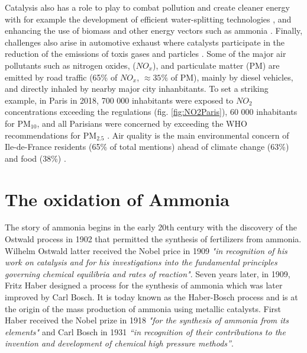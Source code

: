 Catalysis also has a role to play to combat pollution and create cleaner energy with for example the development of efficient water-splitting technologies \parencite{AHMAD2015599}, and enhancing the use of biomass and other energy vectors such as ammonia \parencite{Fang2022}.
Finally, challenges also arise in automotive exhaust where catalysts participate in the reduction of the emissions of toxis gases and particles \parencite{WHOAirPollution, GANDHI2003433}.
Some of the major air pollutants such as nitrogen oxides, ($NO_x$), and particulate matter (PM) are emitted by road traffic (65\% of $NO_x$, $\approx 35\%$ of PM), mainly by diesel vehicles, and directly inhaled by nearby major city inhanbitants.
To set a striking example, in Paris in 2018, 700 000 inhabitants were exposed to $NO_2$ concentrations exceeding the regulations (fig. \ref{fig:NO2Paris}), 60 000 inhabitants for PM$_{10}$, and all Parisians were concerned by exceeding the WHO recommendations for PM$_{2.5}$ \parencite{AirParis}.
Air quality is the main environmental concern of Ile-de-France residents (65\% of total mentions) ahead of climate change (63\%) and food (38\%) \parencite{AirParis}.

\section{The oxidation of Ammonia}

The story of ammonia begins in the early 20th century with the discovery of the Ostwald process in 1902 that permitted the synthesis of fertilizers from ammonia.
Wilhelm Ostwald latter received the Nobel price in 1909 \textit{"in recognition of his work on catalysis and for his investigations into the fundamental principles governing chemical equilibria and rates of reaction"}.
Seven years later, in 1909, Fritz Haber designed a process for the synthesis of ammonia which was later improved by Carl Bosch.
It is today known as the Haber-Bosch process and is at the origin of the mass production of ammonia using metallic catalysts.
First Haber received the Nobel prize in 1918 \textit{"for the synthesis of ammonia from its elements"} \parencite{Alexander1920} and Carl Bosch in 1931 \textit{“in recognition of their contributions to the invention and development of chemical high pressure methods”}.

